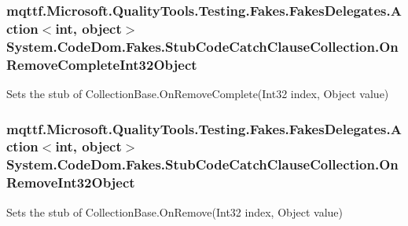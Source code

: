 \hypertarget{class_system_1_1_code_dom_1_1_fakes_1_1_stub_code_catch_clause_collection_a92a910b3683bb82f870c607c222ce837}{
\subsubsection[{On\-Remove\-Complete\-Int32\-Object}]{\setlength{\rightskip}{0pt plus 5cm}mqttf.\-Microsoft.\-Quality\-Tools.\-Testing.\-Fakes.\-Fakes\-Delegates.\-Action$<$int, object$>$ System.\-Code\-Dom.\-Fakes.\-Stub\-Code\-Catch\-Clause\-Collection.\-On\-Remove\-Complete\-Int32\-Object}}\label{class_system_1_1_code_dom_1_1_fakes_1_1_stub_code_catch_clause_collection_a92a910b3683bb82f870c607c222ce837}


Sets the stub of Collection\-Base.\-On\-Remove\-Complete(\-Int32 index, Object value)

\hypertarget{class_system_1_1_code_dom_1_1_fakes_1_1_stub_code_catch_clause_collection_ad05b3518bde61241d49f3aec0241f5f2}{
\subsubsection[{On\-Remove\-Int32\-Object}]{\setlength{\rightskip}{0pt plus 5cm}mqttf.\-Microsoft.\-Quality\-Tools.\-Testing.\-Fakes.\-Fakes\-Delegates.\-Action$<$int, object$>$ System.\-Code\-Dom.\-Fakes.\-Stub\-Code\-Catch\-Clause\-Collection.\-On\-Remove\-Int32\-Object}}\label{class_system_1_1_code_dom_1_1_fakes_1_1_stub_code_catch_clause_collection_ad05b3518bde61241d49f3aec0241f5f2}


Sets the stub of Collection\-Base.\-On\-Remove(\-Int32 index, Object value)

